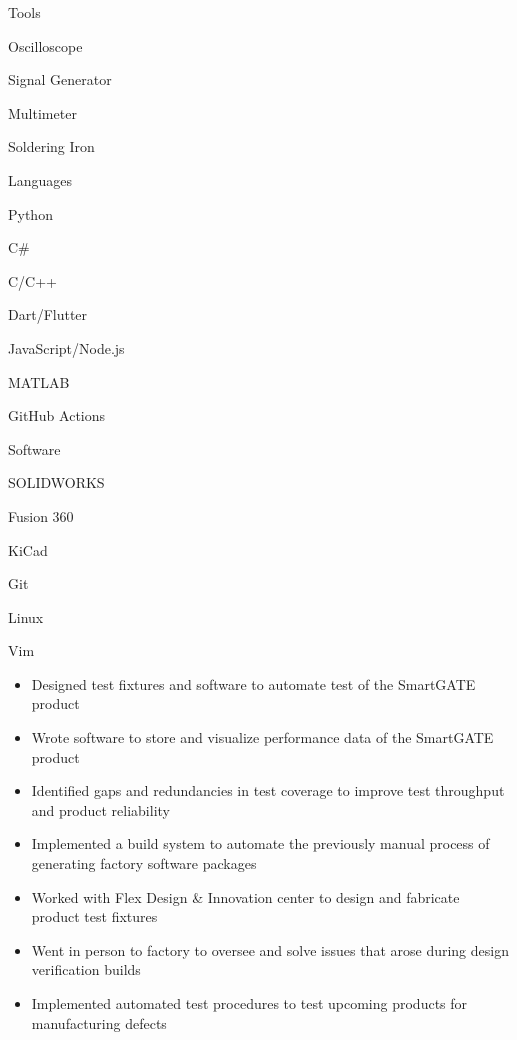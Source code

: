 \documentclass{resume}
\author{Jasper Chan}
\begin{document}
\maketitle

\vspace{-1em} %
\TechnicalSkills

\begin{TechSkills}{Tools}
    \item Oscilloscope
    \item Signal Generator
    \item Multimeter
    \item Soldering Iron
\end{TechSkills}
\begin{TechSkills}{Languages}
    \item Python
    \item C\#
    \item C/C++
    \item Dart/Flutter
    \item JavaScript/Node.js
    \item MATLAB
    \item GitHub Actions
\end{TechSkills}
\begin{TechSkills}{Software}
    \item SOLIDWORKS
    \item Fusion 360
    \item KiCad
    \item Git
    \item Linux
    \item Vim
\end{TechSkills}

\WorkExperience

\begin{itemize}
    \item Designed test fixtures and software to automate test of the SmartGATE product
    \item Wrote software to store and visualize performance data of the SmartGATE product
    \item Identified gaps and redundancies in test coverage to improve test throughput and product reliability
\end{itemize}

\begin{itemize}
    \item Implemented a build system to automate the previously manual process of generating factory software packages
    \item Worked with Flex Design \& Innovation center to design and fabricate product test fixtures
    \item Went in person to factory to oversee and solve issues that arose during design verification builds
    \item Implemented automated test procedures to test upcoming products for manufacturing defects
\end{itemize}
\end{document}

